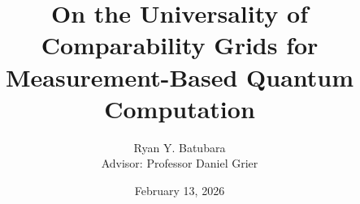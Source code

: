 \documentclass{beamer}
\title{On the Universality of Comparability Grids for Measurement-Based Quantum Computation}
\author{Ryan Y. Batubara\\Advisor: Professor Daniel Grier}
\institute{UCSD\\[2\baselineskip]Mathematics Undergraduate Honors Presentation}
\date{February 13, 2026}
\begin{document}
\begin{frame}
  \titlepage
\end{frame}














\end{document}
